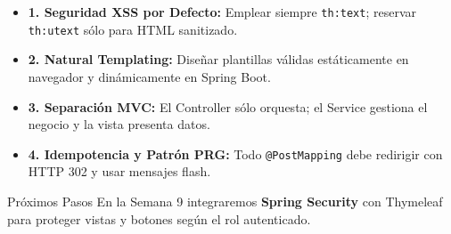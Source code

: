 \documentclass[aspectratio=169]{beamer}
\begin{document}
  {
    \begin{itemize}
      \item \textbf{1. Seguridad XSS por Defecto:} Emplear siempre \texttt{th:text}; reservar \texttt{th:utext} s\'olo para HTML sanitizado.
      \item \textbf{2. Natural Templating:} Dise\~nar plantillas v\'alidas est\'aticamente en navegador y din\'amicamente en Spring Boot.
      \item \textbf{3. Separaci\'on MVC:} El Controller s\'olo orquesta; el Service gestiona el negocio y la vista presenta datos.
      \item \textbf{4. Idempotencia y Patr\'on PRG:} Todo \texttt{@PostMapping} debe redirigir con HTTP 302 y usar mensajes flash.
    \end{itemize}
  }
  {Pr\'oximos Pasos}
  {En la Semana 9 integraremos \textbf{Spring Security} con Thymeleaf para proteger vistas y botones seg\'un el rol autenticado.}

\end{document}
